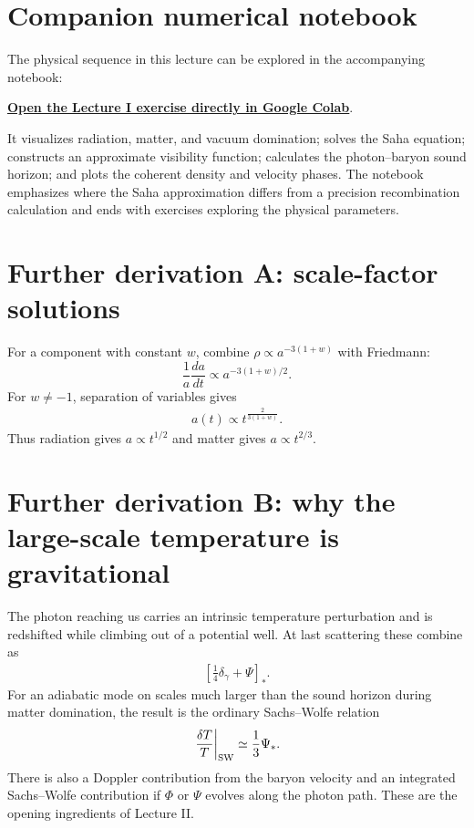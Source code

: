 \documentclass[12pt]{article}
\newcommand{\be}{\begin{eqnarray}}
\newcommand{\ee}{\end{eqnarray}}
\begin{document}
\section*{Companion numerical notebook}
The physical sequence in this lecture can be explored in the accompanying notebook:
\begin{center}
\href{https://colab.research.google.com/github/daanmeerburg/RTG_3186_CMB_Lectures/blob/main/CMB_physics_from_expansion_to_acoustics.ipynb}{\textbf{Open the Lecture I exercise directly in Google Colab}}.
\end{center}
It visualizes radiation, matter, and vacuum domination; solves the Saha equation;
constructs an approximate visibility function; calculates the photon--baryon sound
horizon; and plots the coherent density and velocity phases. The notebook emphasizes
where the Saha approximation differs from a precision recombination calculation and
ends with exercises exploring the physical parameters.

\section*{Further derivation A: scale-factor solutions}
For a component with constant $w$, combine $\rho\propto a^{-3(1+w)}$ with Friedmann:
\[
\frac{1}{a}\frac{da}{dt}\propto a^{-3(1+w)/2}.
\]
For $w\ne-1$, separation of variables gives
\be
a(t)\propto t^{\frac{2}{3(1+w)}}.
\ee
Thus radiation gives $a\propto t^{1/2}$ and matter gives $a\propto t^{2/3}$.

\section*{Further derivation B: why the large-scale temperature is gravitational}
The photon reaching us carries an intrinsic temperature perturbation and is redshifted
while climbing out of a potential well. At last scattering these combine as
\be
\left[\frac14\delta_\gamma+\Psi\right]_*.
\ee
For an adiabatic mode on scales much larger than the sound horizon during matter
domination, the result is the ordinary Sachs--Wolfe relation
\be
\left.\frac{\delta T}{T}\right|_{\rm SW}\simeq\frac13\Psi_*.
\ee
There is also a Doppler contribution from the baryon velocity and an integrated
Sachs--Wolfe contribution if $\Phi$ or $\Psi$ evolves along the photon path. These are
the opening ingredients of Lecture II.
\end{document}
